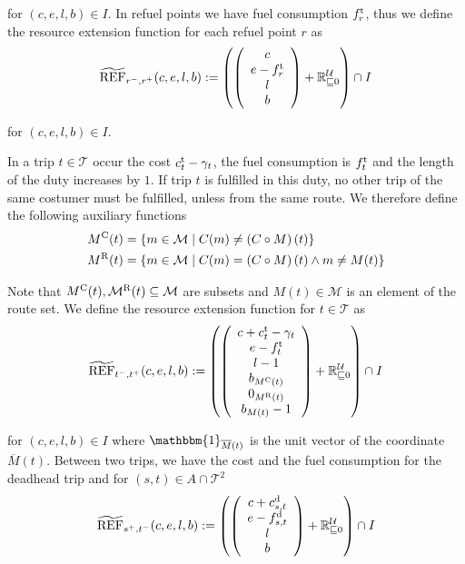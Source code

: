 for $(c,e,l,b)\in I$. In refuel points we have fuel consumption $f^{\operatorname{t}}_r$, thus we define the resource extension function for each refuel point $r$ as
\begin{align*}
	\widetilde{\operatorname{REF}}_{r^-,r^+}(c,e,l,b) := \left(\left(
	\begin{array}{c}
		c \\ e-f^{\operatorname{t}}_r \\ l \\ b
	\end{array}
	\right) + \mathbb{R}^{\mathcal{U}}_{\sqsubseteq 0}\right) \cap I
\end{align*}

for $(c,e,l,b)\in I$. 

In a trip $t\in\mathcal{T}$ occur the cost $c^{\operatorname{t}}_t-\gamma_t$, the fuel consumption is $f^{\operatorname{t}}_t$ and the length of the duty increases by $1$. If trip $t$ is fulfilled in this duty, no other trip of the same costumer must be fulfilled, unless from the same route. We therefore define the following auxiliary functions
\begin{align*}
	M^{\operatorname{C}}(t) & = \left\{m\in\mathcal{M}\mid C(m)\neq\left(C\circ M\right)(t)\right\} \\
	M^{\operatorname{R}}(t) & = \left\{m\in\mathcal{M}\mid C(m)=\left(C\circ M\right)(t)\land m\neq M(t)\right\}
\end{align*}

Note that $M^{\operatorname{C}}(t),\mathcal{M}^{\operatorname{R}}(t)\subseteq\mathcal{M}$ are subsets and $M(t)\in\mathcal{M}$ is an element of the route set. We define the resource extension function for $t\in\mathcal{T}$ as
\begin{align}
	\widetilde{\operatorname{REF}}_{t^-,t^+}(c,e,l,b) := \left(\left(
	\begin{array}{c}
		c+c^{\operatorname{t}}_t-\gamma_t \\ e-f^{\operatorname{t}}_t \\ l-1 \\ b_{M^{\operatorname{C}}(t)} \\ 0_{M^{\operatorname{R}}(t)} \\ b_{M(t)} - 1
	\end{array}
	\right) + \mathbb{R}^{\mathcal{U}}_{\sqsubseteq 0}\right) \cap I \label{eq:ref_trip}
\end{align}

for $(c,e,l,b)\in I$ where $\mathbbm{1}_{\overline{M}(t)}$ is the unit vector of the coordinate $\overline{M}(t)$. Between two trips, we have the cost and the fuel consumption for the deadhead trip and for ${(s,t)\in A\cap\mathcal{T}^2}$
\begin{align*}
	\widetilde{\operatorname{REF}}_{s^+,t^-}(c,e,l,b) := \left(\left(
	\begin{array}{c}
		c + c^{\operatorname{d}}_{s,t} \\ e-f^{\operatorname{d}}_{s,t} \\ l \\ b
	\end{array}
	\right) + \mathbb{R}^{\mathcal{U}}_{\sqsubseteq 0}\right) \cap I
\end{align*}

